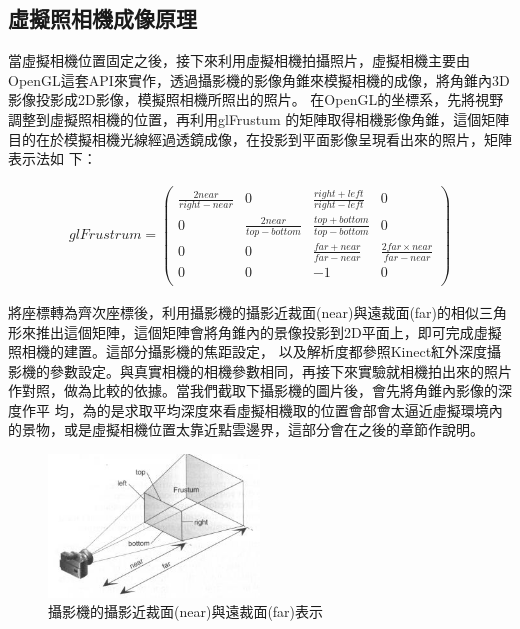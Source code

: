 \subsection{虛擬照相機成像原理}
%
	當虛擬相機位置固定之後，接下來利用虛擬相機拍攝照片，虛擬相機主要由OpenGL這套API來實作，透過攝影機的影像角錐來模擬相機的成像，將角錐內3D影像投影成2D影像，模擬照相機所照出的照片。
	在OpenGL的坐標系，先將視野調整到虛擬照相機的位置，再利用glFrustum 的矩陣取得相機影像角錐，這個矩陣目的在於模擬相機光線經過透鏡成像，在投影到平面影像呈現看出來的照片，矩陣表示法如
	下：
	
	\begin{align}
	glFrustrum = \left(
		 			\begin{array}{cccc}
		 			\frac{2near}{right - near} & 0 & \frac{right + left}{right - left} & 0 \\
		 			0 & \frac{2near}{top - bottom} & \frac{top + bottom}{top - bottom} & 0 \\
		 			0 & 0 & \frac{far + near}{far - near}  & \frac{2far \times near}{far - near} \\
		 			0 & 0 & -1 & 0 \\
		 			\end{array}
		 		\right)
	\end{align}
	
	                    
	將座標轉為齊次座標後，利用攝影機的攝影近裁面(near)與遠裁面(far)的相似三角形來推出這個矩陣，這個矩陣會將角錐內的景像投影到2D平面上，即可完成虛擬照相機的建置。這部分攝影機的焦距設定，
	以及解析度都參照Kinect紅外深度攝影機的參數設定。與真實相機的相機參數相同，再接下來實驗就相機拍出來的照片作對照，做為比較的依據。當我們截取下攝影機的圖片後，會先將角錐內影像的深度作平
	均，為的是求取平均深度來看虛擬相機取的位置會部會太逼近虛擬環境內的景物，或是虛擬相機位置太靠近點雲邊界，這部分會在之後的章節作說明。
	
	\begin{figure}
	\begin{center}
	  \includegraphics[width=0.5\textwidth]{figures/Camera_image.jpg}
	  \caption{攝影機的攝影近裁面(near)與遠裁面(far)表示}
	  \label{fig:glFrustum}
	\end{center}
	\end{figure}	

